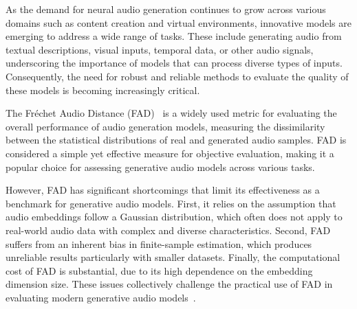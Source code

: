 \begin{table}[h]
\centering
{}
\vspace{0.2cm}
\caption{Comparison of FAD and KAD: KAD is distribution-free, unbiased, and computationally efficient, even for high embedding dimensions ($d \leq 2048$) and large sample sizes ($N \leq 10k$).}
\label{tab:fad_kad_comparison}
\end{table}

As the demand for neural audio generation continues to grow across various domains such as content creation and virtual environments, innovative models are emerging to address a wide range of tasks. These include generating audio from textual descriptions, visual inputs, temporal data, or other audio signals, underscoring the importance of models that can process diverse types of inputs. Consequently, the need for robust and reliable methods to evaluate the quality of these models is becoming increasingly critical.

The Fréchet Audio Distance (FAD)~\cite{fad} is a widely used metric for evaluating the overall performance of audio generation models, measuring the dissimilarity between the statistical distributions of real and generated audio samples.
FAD is considered a simple yet effective measure for objective evaluation, making it a popular choice for assessing generative audio models across various tasks.

However, FAD has significant shortcomings that limit its effectiveness as a benchmark for generative audio models. 
First, it relies on the assumption that audio embeddings follow a Gaussian distribution, which often does not apply to real-world audio data with complex and diverse characteristics. Second, FAD suffers from an inherent bias in finite-sample estimation, which produces unreliable results particularly with smaller datasets. Finally, the computational cost of FAD is substantial, due to its high dependence on the embedding dimension size. 
These issues collectively challenge the practical use of FAD in evaluating modern generative audio models~\cite{jayasumana2024rethinking,chong2020effectively,tailleur2024correlation,gui2024adapting}.

